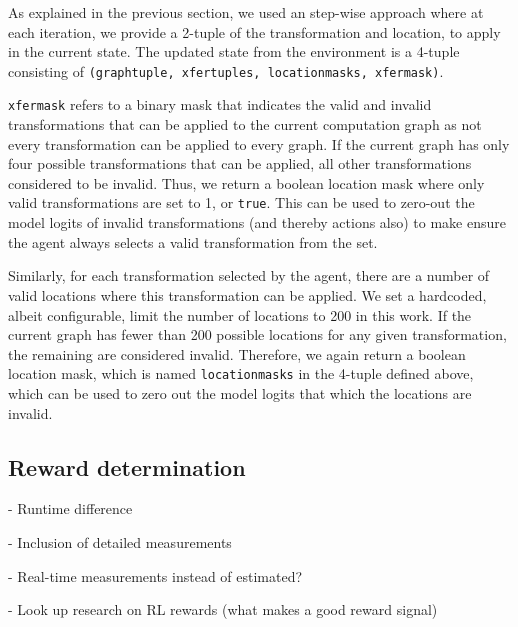 As explained in the previous section, we used an step-wise approach where at each iteration, we provide a 2-tuple of the transformation and location, to apply in the current state. The updated state from the environment is a 4-tuple consisting of \texttt{(graph\textunderscore tuple, xfer\textunderscore tuples, location\textunderscore masks, xfer\textunderscore mask)}.

\texttt{xfer\textunderscore mask} refers to a binary mask that indicates the valid and invalid transformations that can be applied to the current computation graph as not every transformation can be applied to every graph. If the current graph has only four possible transformations that can be applied, all other transformations considered to be invalid. Thus, we return a boolean location mask where only valid transformations are set to 1, or \texttt{true}. This can be used to zero-out the model logits of invalid transformations (and thereby actions also) to make ensure the agent always selects a valid transformation from the set.

Similarly, for each transformation selected by the agent, there are a number of valid locations where this transformation can be applied. We set a hardcoded, albeit configurable, limit the number of locations to 200 in this work. If the current graph has fewer than 200 possible locations for any given transformation, the remaining are considered invalid. Therefore, we again return a boolean location mask, which is named \texttt{location\textunderscore masks} in the 4-tuple defined above, which can be used to zero out the model logits that which the locations are invalid. 


\subsection{Reward determination}
\label{sec:prob:subsec:rwd}
- Runtime difference

- Inclusion of detailed measurements

- Real-time measurements instead of estimated?

- Look up research on RL rewards (what makes a good reward signal)
